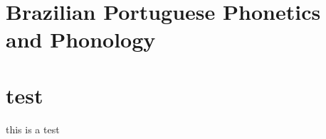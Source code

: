 \documentclass[nohyper,b5paper,openany]{tufte-book}
\begin{document}
\part{Brazilian Portuguese Phonetics and Phonology}
{
%
%
%

}


\part{test}
this is a test



%
%

\end{document}

